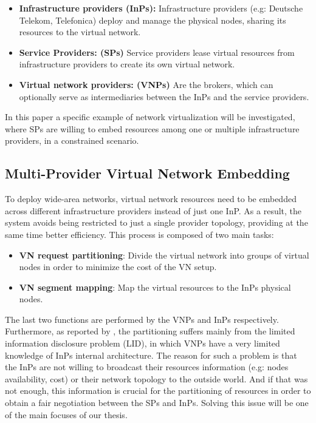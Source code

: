 \begin{itemize}
	
	\item \textbf{Infrastructure providers (InPs):} Infrastructure providers (e.g: Deutsche Telekom, Telefonica) deploy and manage the physical nodes, sharing its resources to the virtual network.  
	\item \textbf{Service Providers: (SPs)} Service providers lease virtual resources from infrastructure providers to create its own virtual network.
		\item \textbf{Virtual network providers: (VNPs)} Are the brokers, which can optionally serve as intermediaries between the InPs and the service providers. 
\end{itemize}

In this paper a specific example of network virtualization will be investigated, where SPs are willing to embed resources among one or multiple infrastructure providers, in a constrained scenario.

\subsection{Multi-Provider Virtual Network Embedding}

To deploy wide-area networks, virtual network resources need to be embedded across different infrastructure providers instead of just one InP. As a result, the system avoids being restricted to just a single provider topology, providing at the same time better efficiency. This process is composed of two main tasks: 

\begin{itemize}
	\item \textbf{VN request partitioning}: Divide the virtual network into groups of virtual nodes in order to minimize the cost of the VN setup.
	\item \textbf{VN segment mapping}: Map the virtual resources to the InPs physical nodes.
\end{itemize}

The last two functions are performed by the VNPs and InPs respectively. Furthermore, as reported by \cite{dietrich2015multi}, the partitioning suffers mainly from the limited information disclosure problem (LID), in which VNPs have a very limited knowledge of InPs internal architecture. The reason for such a problem is that the InPs are not willing to broadcast their resources information (e.g: nodes availability, cost) or their network topology to the outside world. And if that was not enough, this information is crucial for the partitioning of resources in order to obtain a fair negotiation between the SPs and InPs. Solving this issue will be one of the main focuses of our thesis.  

